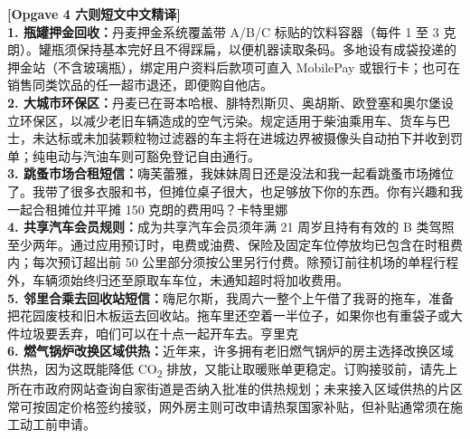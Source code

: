 \begin{transbox}
\small
\textbf{\color{NCDTeal}[Opgave 4 六则短文中文精译]}\\
\textbf{1. 瓶罐押金回收：}丹麦押金系统覆盖带 A/B/C 标贴的饮料容器（每件 1 至 3 克朗）。罐瓶须保持基本完好且不得踩扁，以便机器读取条码。多地设有成袋投递的押金站（不含玻璃瓶），绑定用户资料后款项可直入 MobilePay 或银行卡；也可在销售同类饮品的任一超市退还，即便购自他店。\\[2pt]
\textbf{2. 大城市环保区：}丹麦已在哥本哈根、腓特烈斯贝、奥胡斯、欧登塞和奥尔堡设立环保区，以减少老旧车辆造成的空气污染。规定适用于柴油乘用车、货车与巴士，未达标或未加装颗粒物过滤器的车主将在进城边界被摄像头自动拍下并收到罚单；纯电动与汽油车则可豁免登记自由通行。\\[2pt]
\textbf{3. 跳蚤市场合租短信：}嗨芙蕾雅，我妹妹周日还是没法和我一起看跳蚤市场摊位了。我带了很多衣服和书，但摊位桌子很大，也足够放下你的东西。你有兴趣和我一起合租摊位并平摊 150 克朗的费用吗？卡特里娜\\[2pt]
\textbf{4. 共享汽车会员规则：}成为共享汽车会员须年满 21 周岁且持有有效的 B 类驾照至少两年。通过应用预订时，电费或油费、保险及固定车位停放均已包含在时租费内；每次预订超出前 50 公里部分须按公里另行付费。除预订前往机场的单程行程外，车辆须始终归还至原取车车位，未通知超时将加收费用。\\[2pt]
\textbf{5. 邻里合乘去回收站短信：}嗨尼尔斯，我周六一整个上午借了我哥的拖车，准备把花园废枝和旧木板运去回收站。拖车里还空着一半位子，如果你也有重袋子或大件垃圾要丢弃，咱们可以在十点一起开车去。亨里克\\[2pt]
\textbf{6. 燃气锅炉改换区域供热：}近年来，许多拥有老旧燃气锅炉的房主选择改换区域供热，因为这既能降低 CO\textsubscript{2} 排放，又能让取暖账单更稳定。订购接驳前，请先上所在市政府网站查询自家街道是否纳入批准的供热规划；未来接入区域供热的片区常可按固定价格签约接驳，网外房主则可改申请热泵国家补贴，但补贴通常须在施工动工前申请。
\end{transbox}

